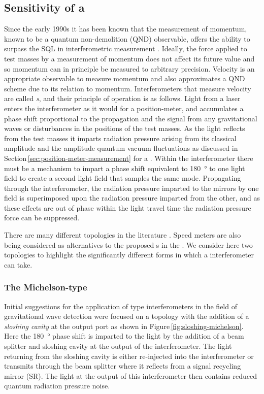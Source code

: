 \subsection{\label{sec:speed-meter-measurement}Sensitivity of a \SM{}}
Since the early 1990s it has been known that the measurement of momentum, known to be a quantum non-demolition (\gls{QND}) observable, offers the ability to surpass the \gls{SQL} in interferometric measurement \cite{Braginsky1990}. Ideally, the force applied to test masses by a measurement of momentum does not affect its future value and so momentum can in principle be measured to arbitrary precision. Velocity is an appropriate observable to measure momentum and also approximates a \gls{QND} scheme due to its relation to momentum. Interferometers that measure velocity are called \emph{\SM{}s}, and their principle of operation is as follows. Light from a laser enters the interferometer as it would for a position-meter, and accumulates a phase shift proportional to the propagation and the signal from any gravitational waves or disturbances in the positions of the test masses. As the light reflects from the test masses it imparts radiation pressure arising from its classical amplitude and the amplitude quantum vacuum fluctuations as discussed in Section\,\ref{sec:position-meter-measurement} for a \FPMI{}. Within the interferometer there must be a mechanism to impart a phase shift equivalent to \SI{180}{\degree} to one light field to create a second light field that samples the same mode. Propagating through the interferometer, the radiation pressure imparted to the mirrors by one field is superimposed upon the radiation pressure imparted from the other, and as these effects are out of phase within the light travel time the radiation pressure force can be suppressed.

There are many different \SM{} topologies in the literature \cite{Danilishin2004, Wang2013, Huttner2016, Wade2012}. Speed meters are also being considered as alternatives to the proposed \MI{}s in the \ET{} \cite{MuellerEbhardt2009a, Voronchev2015}. We consider here two \SM{} topologies to highlight the significantly different forms in which a \SM{} interferometer can take.

\subsubsection{The Michelson-type \SM{}}
Initial suggestions for the application of \SM{} type interferometers in the field of gravitational wave detection were focused on a \FPMI{} topology with the addition of a \emph{sloshing cavity} at the output port \cite{Braginsky2000, Purdue2002} as shown in Figure\,\ref{fig:sloshing-michelson}. Here the \SI{180}{\degree} phase shift is imparted to the light by the addition of a beam splitter and sloshing cavity at the output of the interferometer. The light returning from the sloshing cavity is either re-injected into the interferometer or transmits through the beam splitter where it reflects from a signal recycling mirror (SR). The light at the output of this interferometer then contains reduced quantum radiation pressure noise.

